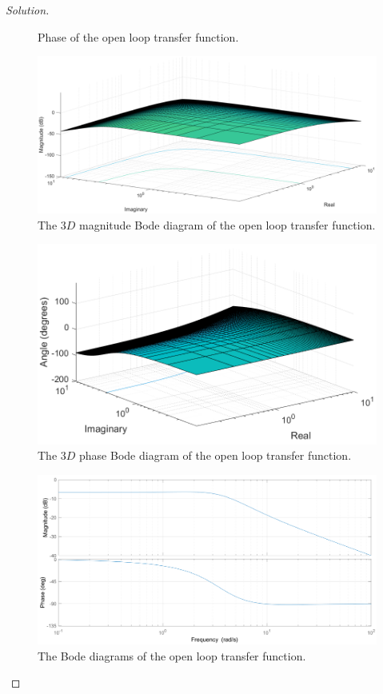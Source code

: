 \documentclass[12pt]{article}
\newenvironment{solution}{\begin{proof}[Solution]}{\end{proof}}
\begin{document}
\begin{solution}
\begin{figure}[!h]
	\centering
	\caption{Phase of the open loop transfer function.}
	\label{fig_3Dphase}
\end{figure}
\begin{figure}[!h]
	\includegraphics[width=.8\columnwidth]{figures/1_4_magnitudeForBode.png}
	\centering
	\caption{The $3D$ magnitude Bode diagram of the open loop transfer function.}
	\label{fig_magnitudeBode}
\end{figure}
\begin{figure}[!h]
	\includegraphics[width=.8\columnwidth]{figures/1_4_phaseForBode.png}
	\centering
	\caption{The $3D$ phase Bode diagram of the open loop transfer function.}
	\label{fig_phaseBode}
\end{figure}
\begin{figure}[!h]
	\includegraphics[width=.8\columnwidth]{figures/1_4_bode.png}
	\centering
	\caption{The Bode diagrams of the open loop transfer function.}
	\label{fig_bode}
\end{figure}


\end{solution}
\end{document}
